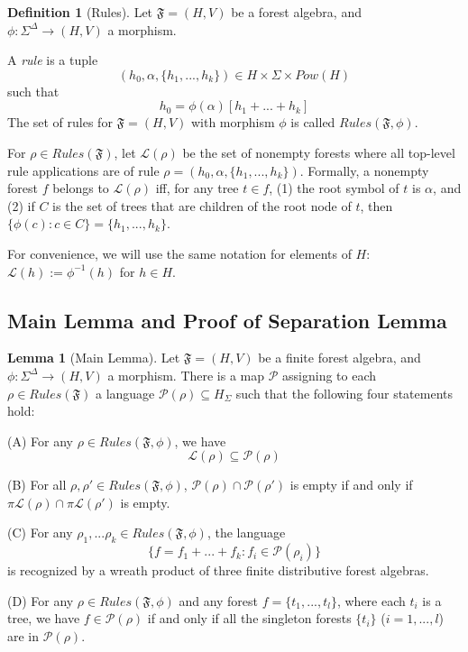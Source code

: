 \documentclass[sigplan,9pt]{acmart}\settopmatter{printfolios=true,printccs=false,printacmref=false}
\newcounter{thm}
\newcounter{theorem}
\theoremstyle{definition}
\newtheorem{defin}[thm]{Definition}
\newtheorem{llemma}[thm]{Lemma}
\newcommand{\La}[0]{{\mathcal{L}}}
\newcommand{\Ff}[0]{{\mathfrak{F}}}
\newcommand{\Pa}[0]{{\mathcal{P}}}
\begin{document}
\begin{defin}[Rules]\label{def:algebras}\label{d:p:ls-lr}
Let $\Ff = (H,V)$ be a forest algebra, and $\phi : \Sigma^\Delta \rightarrow (H,V)$ a morphism.

A \emph{rule} is a tuple $$(h_0, \alpha, \{h_1, ..., h_k\}) \in H \times \Sigma \times Pow(H)$$ such that $$h_0 = \phi(\alpha)[h_1 + ... + h_k]$$
The set of rules for $\Ff = (H,V)$ with morphism $\phi$ is called $Rules(\Ff, \phi)$.


 For $\rho \in Rules(\Ff)$, let $\La(\rho)$ be the set of nonempty forests where all top-level rule applications are of rule $\rho = (h_0, \alpha, \{h_1, ..., h_k\})$.
Formally, a nonempty forest $f$ belongs to $\La(\rho)$ iff, for any tree $t \in f$, (1) the root symbol of $t$ is $\alpha$, and (2) if $C$ is the set of trees that are children of the root node of $t$, then $\{\phi(c) :c \in C\} = \{h_1, ... , h_k\}$.

For convenience, we will use the same notation for elements of $H$: $\La(h) := \phi^{-1}(h)$ for $h \in H$.

\end{defin}



\subsection{Main Lemma and Proof of Separation Lemma}



\begin{llemma}[Main Lemma]\label{prop:main-lemma}
Let $\Ff = (H,V)$ be a finite forest algebra, and $\phi : \Sigma^\Delta\rightarrow(H,V)$ a morphism.
There is a map $\Pa$ assigning to each $\rho \in Rules(\Ff)$ a language $\Pa(\rho) \subseteq H_\Sigma$ such that the following four statements hold: %

(A) For any $\rho \in Rules(\Ff,\phi)$, we have $$\La(\rho) \subseteq \Pa(\rho)$$


(B) For all $\rho, \rho' \in Rules(\Ff,\phi)$,
$\Pa(\rho) \cap \Pa(\rho')$ is empty if and only if $\pi\La(\rho) \cap \pi\La(\rho')$ is empty.

(C) For any $\rho_1, ... \rho_k \in Rules(\Ff,\phi)$, the language $$\{f = f_1 + ... + f_k : f_i \in \Pa(\rho_i)\}$$
is recognized by a wreath product of three finite distributive forest algebras.

(D) For any $\rho \in Rules(\Ff,\phi)$ and any forest $f = \{t_1, ..., t_l\}$, where each $t_i$ is a tree, we have $f \in \Pa(\rho)$ if and only if all the  singleton forests $\{t_i\}$ ($i = 1, ..., l$) are in $\Pa(\rho)$.
\end{llemma}
\end{document}
